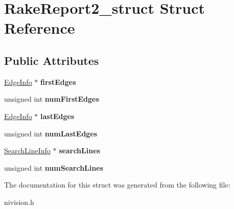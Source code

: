 \hypertarget{structRakeReport2__struct}{
\section{RakeReport2\_\-struct Struct Reference}
\label{structRakeReport2__struct}
}
\subsection*{Public Attributes}
\begin{DoxyCompactItemize}
\item 
\hypertarget{structRakeReport2__struct_aec930438c2a16ef69c31ec8d232caebb}{
\hyperlink{structEdgeInfo__struct}{EdgeInfo} $\ast$ {\bfseries firstEdges}}
\label{structRakeReport2__struct_aec930438c2a16ef69c31ec8d232caebb}

\item 
\hypertarget{structRakeReport2__struct_a8c28717b6e2f18f9d02d9a454fd30c79}{
unsigned int {\bfseries numFirstEdges}}
\label{structRakeReport2__struct_a8c28717b6e2f18f9d02d9a454fd30c79}

\item 
\hypertarget{structRakeReport2__struct_ad1b99b98736e6f6461f2f4fdfb161817}{
\hyperlink{structEdgeInfo__struct}{EdgeInfo} $\ast$ {\bfseries lastEdges}}
\label{structRakeReport2__struct_ad1b99b98736e6f6461f2f4fdfb161817}

\item 
\hypertarget{structRakeReport2__struct_ae90a30da69f347754a84757db874475e}{
unsigned int {\bfseries numLastEdges}}
\label{structRakeReport2__struct_ae90a30da69f347754a84757db874475e}

\item 
\hypertarget{structRakeReport2__struct_a88dd8ef9d57cc6feccf5b0e9f9a32e00}{
\hyperlink{structSearchLineInfo__struct}{SearchLineInfo} $\ast$ {\bfseries searchLines}}
\label{structRakeReport2__struct_a88dd8ef9d57cc6feccf5b0e9f9a32e00}

\item 
\hypertarget{structRakeReport2__struct_a651a5f86ed3612f910c3098223ea22ea}{
unsigned int {\bfseries numSearchLines}}
\label{structRakeReport2__struct_a651a5f86ed3612f910c3098223ea22ea}

\end{DoxyCompactItemize}


The documentation for this struct was generated from the following file:\begin{DoxyCompactItemize}
\item 
nivision.h\end{DoxyCompactItemize}
